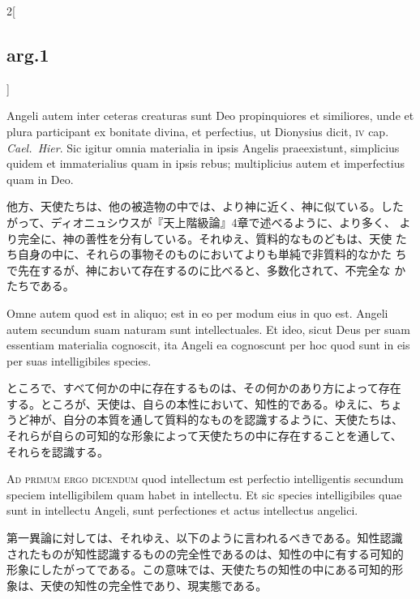 \documentclass[paper=a4paper,fontsize=10pt,jafontsize=9pt,titlepage]{jlreq}
\begin{document}
\begin{paracol}{2}[\subsection{arg.1}]
\switchcolumn*

Angeli autem inter ceteras creaturas sunt Deo propinquiores et
similiores, unde et plura participant ex bonitate divina, et
perfectius, ut Dionysius dicit, {\scshape iv} cap.~{\itshape
Cael.~Hier}. Sic igitur omnia materialia in ipsis Angelis
praeexistunt, simplicius quidem et immaterialius quam in ipsis rebus;
multiplicius autem et imperfectius quam in Deo.

\switchcolumn

他方、天使たちは、他の被造物の中では、より神に近く、神に似ている。した
がって、ディオニュシウスが『天上階級論』4章で述べるように、より多く、
より完全に、神の善性を分有している。それゆえ、質料的なものどもは、天使
たち自身の中に、それらの事物そのものにおいてよりも単純で非質料的なかた
ちで先在するが、神において存在するのに比べると、多数化されて、不完全な
かたちである。

\switchcolumn*

Omne autem quod est in aliquo; est in eo per modum eius in quo
est. Angeli autem secundum suam naturam sunt intellectuales. Et ideo,
sicut Deus per suam essentiam materialia cognoscit, ita Angeli ea
cognoscunt per hoc quod sunt in eis per suas intelligibiles species.

\switchcolumn

ところで、すべて何かの中に存在するものは、その何かのあり方によって存在
する。ところが、天使は、自らの本性において、知性的である。ゆえに、ちょ
うど神が、自分の本質を通して質料的なものを認識するように、天使たちは、
それらが自らの可知的な形象によって天使たちの中に存在することを通して、
それらを認識する。

\switchcolumn*[\subsection{ad.1}]

{\scshape Ad primum ergo dicendum} quod intellectum est perfectio
intelligentis secundum speciem intelligibilem quam habet in
intellectu. Et sic species intelligibiles quae sunt in intellectu
Angeli, sunt perfectiones et actus intellectus angelici.

\switchcolumn

第一異論に対しては、それゆえ、以下のように言われるべきである。知性認識
されたものが知性認識するものの完全性であるのは、知性の中に有する可知的
形象にしたがってである。この意味では、天使たちの知性の中にある可知的形
象は、天使の知性の完全性であり、現実態である。

\switchcolumn*[\subsection{ad.2}]


\end{paracol}
\end{document}
